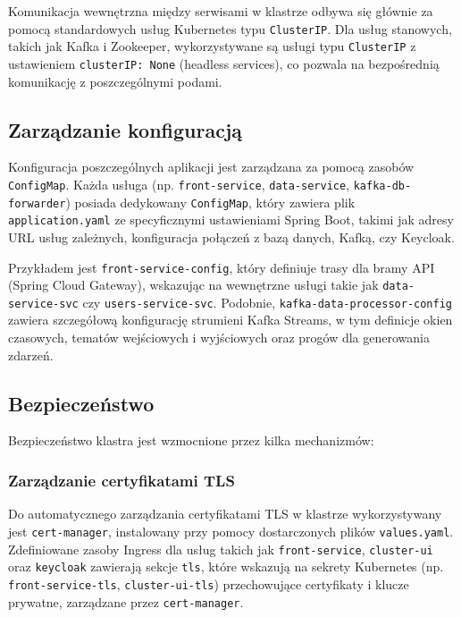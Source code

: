Komunikacja wewnętrzna między serwisami w klastrze odbywa się głównie za pomocą standardowych usług Kubernetes typu \texttt{ClusterIP}. Dla usług stanowych, takich jak Kafka i Zookeeper, wykorzystywane są usługi typu \texttt{ClusterIP} z ustawieniem \texttt{clusterIP: None} (headless services), co pozwala na bezpośrednią komunikację z poszczególnymi podami.

\subsection{Zarządzanie konfiguracją}

Konfiguracja poszczególnych aplikacji jest zarządzana za pomocą zasobów \texttt{ConfigMap}. Każda usługa (np. \texttt{front-service}, \texttt{data-service}, \texttt{kafka-db-forwarder}) posiada dedykowany \texttt{ConfigMap}, który zawiera plik \texttt{application.yaml} ze specyficznymi ustawieniami Spring Boot, takimi jak adresy URL usług zależnych, konfiguracja połączeń z bazą danych, Kafką, czy Keycloak.

Przykładem jest \texttt{front-service-config}, który definiuje trasy dla bramy API (Spring Cloud Gateway), wskazując na wewnętrzne usługi takie jak \texttt{data-service-svc} czy \texttt{users-service-svc}. Podobnie, \texttt{kafka-data-processor-config} zawiera szczegółową konfigurację strumieni Kafka Streams, w tym definicje okien czasowych, tematów wejściowych i wyjściowych oraz progów dla generowania zdarzeń.

\subsection{Bezpieczeństwo}

Bezpieczeństwo klastra jest wzmocnione przez kilka mechanizmów:

\subsubsection{Zarządzanie certyfikatami TLS}
Do automatycznego zarządzania certyfikatami TLS w klastrze wykorzystywany jest \texttt{cert-manager}, instalowany przy pomocy dostarczonych plików \texttt{values.yaml}. Zdefiniowane zasoby Ingress dla usług takich jak \texttt{front-service}, \texttt{cluster-ui} oraz \texttt{keycloak} zawierają sekcje \texttt{tls}, które wskazują na sekrety Kubernetes (np. \texttt{front-service-tls}, \texttt{cluster-ui-tls}) przechowujące certyfikaty i klucze prywatne, zarządzane przez \texttt{cert-manager}.

